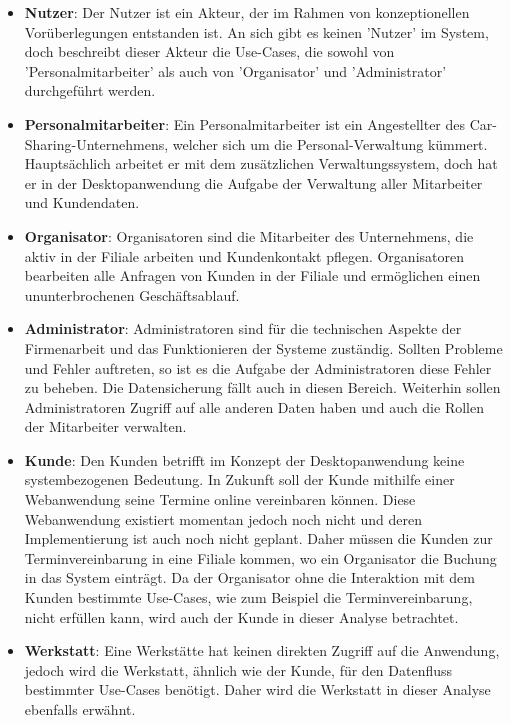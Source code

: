 \begin{itemize}
    \item \textbf{Nutzer}: Der Nutzer ist ein Akteur, der im Rahmen von konzeptionellen Vorüberlegungen entstanden ist. An sich gibt es keinen 'Nutzer' im System, doch beschreibt dieser Akteur die Use-Cases, die sowohl von 'Personalmitarbeiter' als auch von 'Organisator' und 'Administrator' durchgeführt werden.
    \item \textbf{Personalmitarbeiter}: Ein Personalmitarbeiter ist ein Angestellter des Car-Sharing-Unternehmens, welcher sich um die Personal-Verwaltung kümmert. Hauptsächlich arbeitet er mit dem zusätzlichen Verwaltungssystem, doch hat er in der Desktopanwendung die Aufgabe der Verwaltung aller Mitarbeiter und Kundendaten.
    \item \textbf{Organisator}: Organisatoren sind die Mitarbeiter des Unternehmens, die aktiv in der Filiale arbeiten und Kundenkontakt pflegen. Organisatoren bearbeiten alle Anfragen von Kunden in der Filiale und ermöglichen einen ununterbrochenen Geschäftsablauf. 
    \item \textbf{Administrator}: Administratoren
    sind für die technischen Aspekte der Firmenarbeit und das Funktionieren der Systeme zuständig. Sollten Probleme und Fehler auftreten, so ist es die Aufgabe der Administratoren diese Fehler zu beheben. Die Datensicherung fällt auch in diesen Bereich. Weiterhin sollen Administratoren Zugriff auf alle anderen Daten haben und auch die Rollen der Mitarbeiter verwalten.
    \item \textbf{Kunde}: Den Kunden betrifft im Konzept der Desktopanwendung keine systembezogenen Bedeutung. In Zukunft soll der Kunde mithilfe einer Webanwendung seine Termine online vereinbaren können. Diese Webanwendung existiert momentan jedoch noch nicht und deren Implementierung ist auch noch nicht geplant. Daher müssen die Kunden zur Terminvereinbarung in eine Filiale kommen, wo ein Organisator die Buchung in das System einträgt. Da der Organisator ohne die Interaktion mit dem Kunden bestimmte Use-Cases, wie zum Beispiel die Terminvereinbarung, nicht erfüllen kann, wird auch der Kunde in dieser Analyse betrachtet.
    \item \textbf{Werkstatt}: Eine Werkstätte hat keinen direkten Zugriff auf die Anwendung, jedoch wird die Werkstatt, ähnlich wie der Kunde, für den Datenfluss bestimmter Use-Cases benötigt. Daher wird die Werkstatt in dieser Analyse ebenfalls erwähnt.
\end{itemize}


